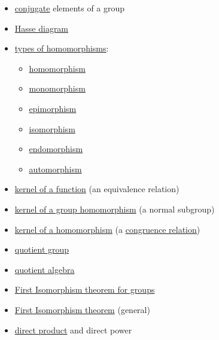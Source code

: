 \documentclass[12pt]{article}
\newcommand{\boldemph}[1]{#1}
\newcommand{\defn}[1]{#1}
\newcommand\<{\ensuremath{\langle}}
\renewcommand\>{\ensuremath{\rangle}}
\begin{document}
\begin{itemize}
\item \href{http://en.wikipedia.org/wiki/Conjugacy_class#Definition}{\boldemph{conjugate}} 
elements of a group
\item \href{http://en.wikipedia.org/wiki/Hasse_diagram}{\defn{Hasse diagram}}
\item \href{http://en.wikipedia.org/wiki/Homomorphism#Specific_kinds_of_homomorphisms}{types of homomorphisms}: 
  \begin{itemize}
  \item \href{http://en.wikipedia.org/wiki/Homomorphism#Definition}{\defn{homomorphism}}
  \item \href{http://en.wikipedia.org/wiki/Monomorphism}{\defn{monomorphism}}
  \item \href{http://en.wikipedia.org/wiki/Epimorphism}{\defn{epimorphism}}
  \item \href{http://en.wikipedia.org/wiki/Isomorphism}{\defn{isomorphism}}
  \item \href{http://en.wikipedia.org/wiki/Endomorphism}{\defn{endomorphism}}
  \item \href{http://en.wikipedia.org/wiki/Automorphism}{\defn{automorphism}}
  \end{itemize}
\item \href{http://en.wikipedia.org/wiki/Kernel_(set_theory)}{\defn{kernel} of a function} 
(an equivalence relation)
\item \href{http://en.wikipedia.org/wiki/Kernel_(algebra)#Group_homomorphisms}{\defn{kernel} 
of a group homomorphism} (a normal subgroup)
\item \href{http://en.wikipedia.org/wiki/Kernel_(algebra)#Universal_algebra}{kernel of a homomorphism} 
(a \href{http://en.wikipedia.org/wiki/Congruence_relation}{congruence relation})
\item \href{http://en.wikipedia.org/wiki/Quotient_group}{quotient group}
\item \href{http://en.wikipedia.org/wiki/Quotient_algebra}{\defn{quotient algebra}} 
\item \href{http://en.wikipedia.org/wiki/Isomorphism_theorem#Groups}{First Isomorphism theorem for groups}
\item \href{http://en.wikipedia.org/wiki/Isomorphism_theorem#General}{First Isomorphism theorem} (general)
\item \href{http://en.wikipedia.org/wiki/Direct_product}{\defn{direct product}} and \defn{direct power}
\end{itemize}
\end{document}
